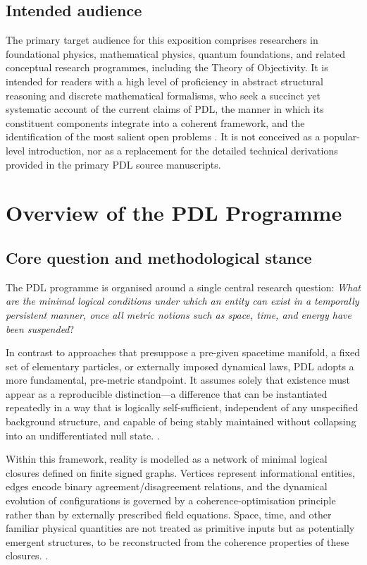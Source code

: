 \documentclass{article}
\begin{document}
\subsection{Intended audience}
\label{subsec:intended_audience}

The primary target audience for this exposition comprises researchers in foundational physics, mathematical physics, quantum foundations, and related conceptual research programmes, including the Theory of Objectivity. It is intended for readers with a high level of proficiency in abstract structural reasoning and discrete mathematical formalisms, who seek a succinct yet systematic account of the current claims of PDL, the manner in which its constituent components integrate into a coherent framework, and the identification of the most salient open problems \citep{PDL_intro,PDL_TO_dialogue,PDL_position}. It is not conceived as a popular-level introduction, nor as a replacement for the detailed technical derivations provided in the primary PDL source manuscripts.

\section{Overview of the PDL Programme}
\label{sec:overview}

\subsection{Core question and methodological stance}
\label{subsec:core_question}

The PDL programme is organised around a single central research question: \emph{What are the minimal logical conditions under which an entity can exist in a temporally persistent manner, once all metric notions such as space, time, and energy have been suspended}? \citep{PDL_Main_2026,PDL_intro}

In contrast to approaches that presuppose a pre-given spacetime manifold, a fixed set of elementary particles, or externally imposed dynamical laws, PDL adopts a more fundamental, pre-metric standpoint. It assumes solely that existence must appear as a reproducible distinction—a difference that can be instantiated repeatedly in a way that is logically self-sufficient, independent of any unspecified background structure, and capable of being stably maintained without collapsing into an undifferentiated null state.
\citep{PDL_Main_2026,PDL_position}.

Within this framework, reality is modelled as a network of minimal logical closures defined on finite signed graphs. Vertices represent informational entities, edges encode binary agreement/disagreement relations, and the dynamical evolution of configurations is governed by a coherence-optimisation principle rather than by externally prescribed field equations. Space, time, and other familiar physical quantities are not treated as primitive inputs but as potentially emergent structures, to be reconstructed from the coherence properties of these closures.
\citep{PDL_Main_2026,PDL_intro}.
\end{document}
